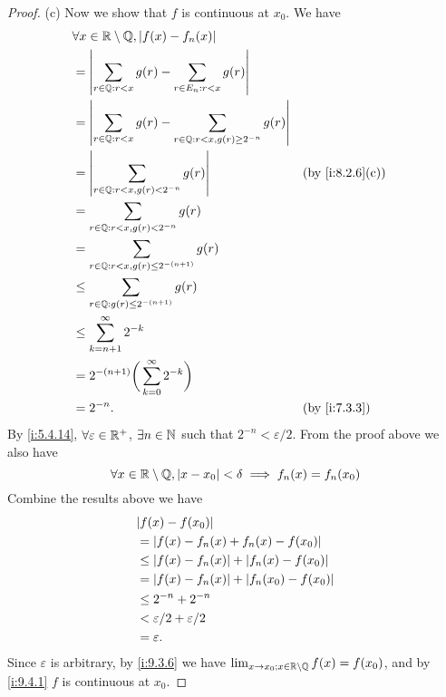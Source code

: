 \begin{proof}{(c)}
  Now we show that \(f\) is continuous at \(x_0\).
  We have
  \begin{align*}
     & \forall x \in \R \setminus \Q, \abs{f(x) - f_n(x)}                                                         \\
     & = \abs{\sum_{r \in \Q : r < x} g(r) - \sum_{r \in E_n : r < x} g(r)}                                       \\
     & = \abs{\sum_{r \in \Q : r < x} g(r) - \sum_{r \in \Q : r < x, g(r) \geq 2^{-n}} g(r)}                      \\
     & = \abs{\sum_{r \in \Q : r < x, g(r) < 2^{-n}} g(r)}                                   &  & \by{i:8.2.6}[c] \\
     & = \sum_{r \in \Q : r < x, g(r) < 2^{-n}} g(r)                                                              \\
     & = \sum_{r \in \Q : r < x, g(r) \leq 2^{-(n + 1)}} g(r)                                                     \\
     & \leq \sum_{r \in \Q : g(r) \leq 2^{-(n + 1)}} g(r)                                                         \\
     & \leq \sum_{k = n + 1}^\infty 2^{-k}                                                                        \\
     & = 2^{-(n + 1)} \bigg(\sum_{k = 0}^\infty 2^{-k}\bigg)                                                      \\
     & = 2^{-n}.                                                                             &  & \by{i:7.3.3}
  \end{align*}
  By \cref{i:5.4.14}, \(\forall \varepsilon \in \mathbb{R}^+\), \(\exists n \in \mathbb{N}\) such that \(2^{-n} < \varepsilon / 2\).
  From the proof above we also have
  \[
    \forall x \in \mathbb{R} \setminus \mathbb{Q}, \left\lvert x - x_0\right\rvert < \delta \implies f_n(x) = f_n(x_0) \\
  \]
  Combine the results above we have
  \begin{align*}
     & \abs{f(x) - f(x_0)}                              \\
     & = \abs{f(x) - f_n(x) + f_n(x) - f(x_0)}          \\
     & \leq \abs{f(x) - f_n(x)} + \abs{f_n(x) - f(x_0)} \\
     & = \abs{f(x) - f_n(x)} + \abs{f_n(x_0) - f(x_0)}  \\
     & \leq 2^{-n} + 2^{-n}                             \\
     & < \varepsilon / 2 + \varepsilon / 2              \\
     & = \varepsilon.
  \end{align*}
  Since \(\varepsilon\) is arbitrary, by \cref{i:9.3.6} we have \(\lim_{x \to x_0 ; x \in \mathbb{R} \setminus \mathbb{Q}} f(x) = f(x_0)\), and by \cref{i:9.4.1} \(f\) is continuous at \(x_0\).
\end{proof}
